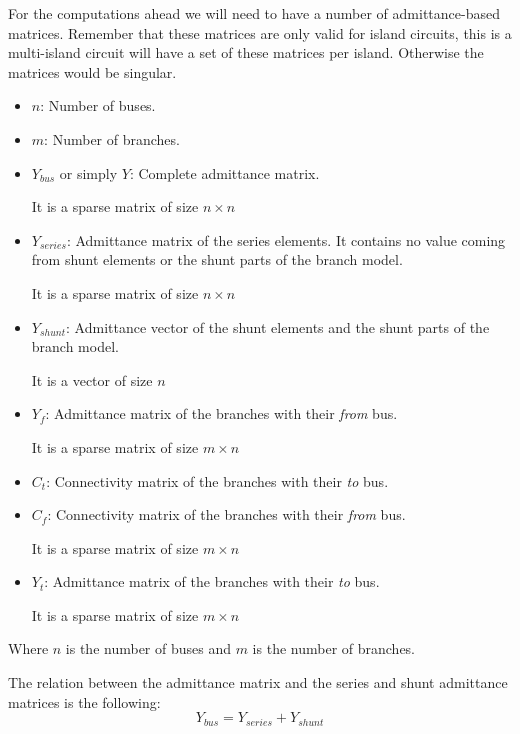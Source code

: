 \documentclass[nols,a4paper,twoside,notoc,fleqn]{tufte-book}
\begin{document}
For the computations ahead we will need to have a number of admittance-based matrices. Remember that these matrices are only valid for island circuits, this is a multi-island circuit will have a set of these matrices per island. Otherwise the matrices would be singular.

\begin{itemize}
	
	\item $n$: Number of buses.
	
	\item $m$: Number of branches.
	
	\item $Y_{bus}$ or simply $Y$: Complete admittance matrix.
	
	It is a sparse matrix of size $n \times n$
	
	\item $Y_{series}$: Admittance matrix of the series elements. It contains no value coming from shunt elements or the shunt parts of the branch model.
	
	It is a sparse matrix of size $n \times n$
	
	\item $Y_{shunt}$: Admittance vector of the shunt elements and the shunt parts of the branch model. 
	
	It is a vector of size $n$
	
	\item $Y_f$: Admittance matrix of the branches with their \textit{from} bus.
	
	It is a sparse matrix of size $m \times n$
	
	\item $C_t$: Connectivity matrix of the branches with their \textit{to} bus.
	
	\item $C_f$: Connectivity matrix of the branches with their \textit{from} bus.
	
	It is a sparse matrix of size $m \times n$
	
	\item $Y_t$: Admittance matrix of the branches with their \textit{to} bus.
	
    It is a sparse matrix of size $m \times n$\newline
\end{itemize}

Where $n$ is the number of buses and $m$ is the number of branches.

The relation between the admittance matrix and the series and shunt admittance matrices is the following:
\begin{equation}
Y_{bus} = Y_{series} + Y_{shunt}
\end{equation}
\end{document}
